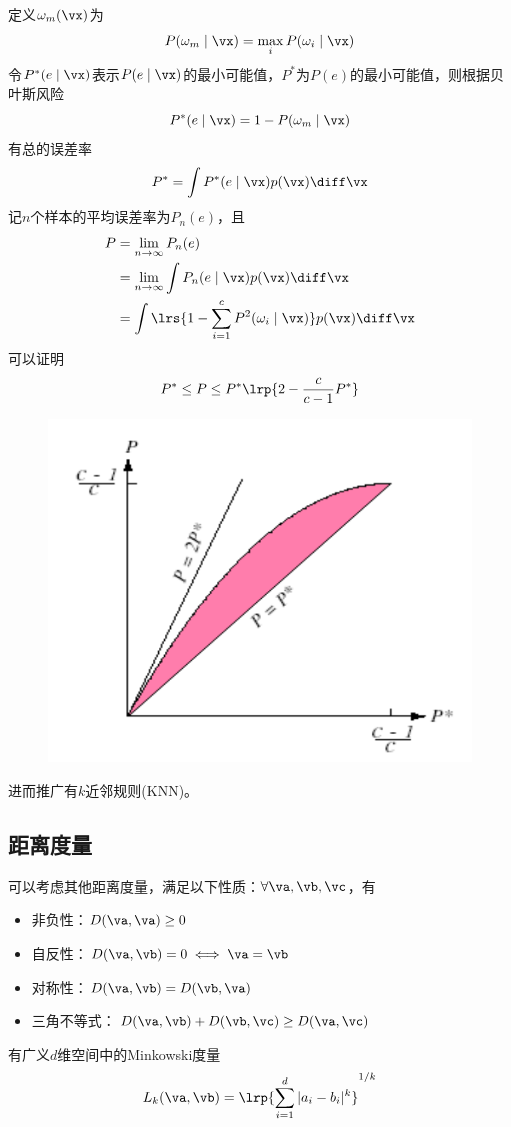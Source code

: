 定义$\omega_m(\vx)$为
\[P(\omega_m\mid\vx)=\max_i P(\omega_i\mid\vx)\]
令$P^*(e\mid\vx)$表示$P(e\mid\vx)$的最小可能值，$P^*$为$P(e)$的最小可能值，则根据贝叶斯风险
\[P^*(e\mid\vx)=1-P(\omega_m\mid\vx)\]
有总的误差率
\[P^*=\int P^*(e\mid\vx)p(\vx)\diff\vx\]
记$n$个样本的平均误差率为$P_n(e)$，且
\[\begin{aligned}
P&=\lim_{n\to\infty}P_n(e)\\
&=\lim_{n\to\infty}\int P_n(e\mid\vx)p(\vx)\diff\vx\\
&=\int\lrs{1-\sum_{i=1}^cP^2(\omega_i\mid\vx)}p(\vx)\diff\vx
\end{aligned}\]
可以证明
\[P^*\leq P\leq P^*\lrp{2-\frac{c}{c-1}P^*}\]
\begin{figure}[H]
\centering
\includegraphics[width=0.4\linewidth]{fig/kNN_error_bound.png}
\end{figure}

进而推广有$k$近邻规则(KNN)。

\subsection{距离度量} %
可以考虑其他距离度量，满足以下性质：$\forall \va,\vb,\vc$，有
\begin{itemize}
	\item 非负性：$D(\va,\va)\geq 0$
	\item 自反性：$D(\va,\vb)=0\iff\va=\vb$
	\item 对称性：$D(\va,\vb)=D(\vb,\va)$
	\item 三角不等式：$D(\va,\vb)+D(\vb,\vc)\geq D(\va,\vc)$
\end{itemize}

有广义$d$维空间中的Minkowski度量
\[L_k(\va,\vb)=\lrp{\sum_{i=1}^d|a_i-b_i|^k}^{1/k}\]